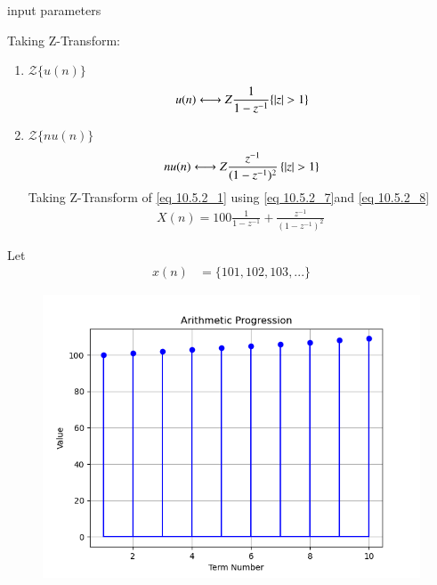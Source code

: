 \documentclass[journal,12pt,onecolumn]{IEEEtran}
\theoremstyle{remark}
\begin{document}
 
 \begin{table}[!ht]
    \centering
        
    \caption{input parameters}
    \label{tab:10_5_3_12}
\end{table}
Taking Z-Transform:
\begin{enumerate}
    \item $\mathcal{Z}\{u(n)\}$
\begin{align}
    u(n) \system{Z} \frac{1}{1-z^{-1}} \{\abs{z} > 1\} \label{eq 10.5.2_7}
\end{align}
    \item $\mathcal{Z}\{nu(n)\}$ 
\begin{align}
    nu(n) \system{Z} \frac{z^{-1}}{(1-z^{-1})^2}\, \{\abs{z} > 1\} \label{eq 10.5.2_8} 
\end{align}
Taking Z-Transform of \eqref{eq 10.5.2_1} using \eqref{eq 10.5.2_7}and \eqref{eq 10.5.2_8}
\begin{align}
    X(n)=100\frac{1}{1-z^{-1}} +\frac{z^{-1}}{(1-z^{-1})^2}\
\end{align}
\end{enumerate}
Let \\
\begin{align}
x(n)&= \lbrace 101,102,103,...\rbrace 
\end{align}
\begin{figure}
    \centering
    \includegraphics{figs/fig1.png}
    \caption{ }
    \label{fig:x(n) }
\end{figure}
 
 
\end{document}
